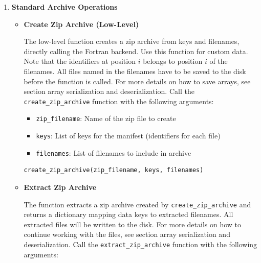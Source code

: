 \begin{enumerate}
\begin{enumerate}
\begin{itemize}
                    \item Data types are restricted to int32, float64, and U5 for characters
                  \end{itemize}
          \end{enumerate}
          
    \item \textbf{Standard Archive Operations}
          \begin{itemize}
            \item \textbf{Create Zip Archive (Low-Level)}
                  
                  The low-level function creates a zip archive from keys and filenames,
                  directly calling the Fortran backend. Use this function for custom data.
                  Note that the identifiers at position $i$ belongs to position $i$ of
                  the filenames. All files named in the filenames have to be saved to the
                  disk before the function is called. For more details on how to save
                  arrays, see section array serialization and deserialization. Call the
                  \texttt{create\_zip\_archive} function with the following arguments:
                  
                  \begin{itemize}
                    \item \texttt{zip\_filename}: Name of the zip file to create
                          
                    \item \texttt{keys}: List of keys for the manifest (identifiers for
                          each file)
                          
                    \item \texttt{filenames}: List of filenames to include in archive
                  \end{itemize}
                  
                  \begin{lstlisting}[language=Python, caption={Python Create Zip Archive (Low-Level)}]
create_zip_archive(zip_filename, keys, filenames)
                  \end{lstlisting}
                  
            \item \textbf{Extract Zip Archive}
                  
                  The function extracts a zip archive created by \texttt{create\_zip\_archive}
                  and returns a dictionary mapping data keys to extracted filenames. All
                  extracted files will be written to the disk. For more details on how
                  to continue working with the files, see section array serialization and
                  deserialization. Call the \texttt{extract\_zip\_archive} function with
                  the following arguments:
                  

\end{itemize}
\end{enumerate}
